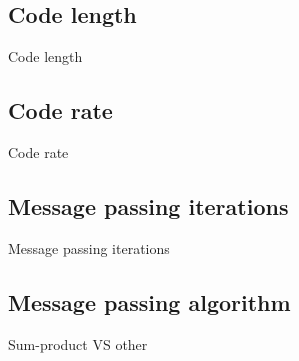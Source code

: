\documentclass{beamer}
\begin{document}
\begin{darkframes}
  \subsection{Code length}
  \begin{frame}{Code length}
  \end{frame}

  \subsection{Code rate}
  \begin{frame}{Code rate}
  \end{frame}

  \subsection{Message passing iterations}
  \begin{frame}{Message passing iterations}
  \end{frame}

  \subsection{Message passing algorithm}
  \begin{frame}{Sum-product VS other}
  \end{frame}

\end{darkframes}
\end{document}

